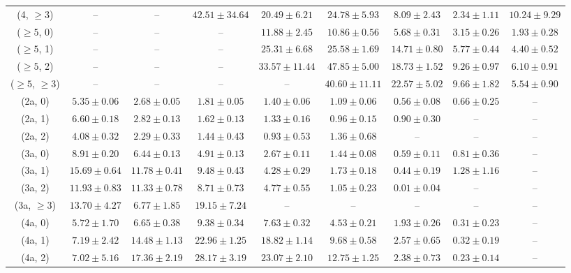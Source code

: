 \begin{table}[h!]
{\begin{tabular}{ccccccccc}
	(4, $\ge3$) & -- & -- & $42.51\pm 34.64$ & $20.49\pm 6.21$ & $24.78\pm 5.93$ & $8.09\pm 2.43$ & $2.34\pm 1.11$ & $10.24\pm 9.29$ \\[0.5ex] 
	($\ge5$, 0) & -- & -- & -- & $11.88\pm 2.45$ & $10.86\pm 0.56$ & $5.68\pm 0.31$ & $3.15\pm 0.26$ & $1.93\pm 0.28$ \\[0.5ex] 
	($\ge5$, 1) & -- & -- & -- & $25.31\pm 6.68$ & $25.58\pm 1.69$ & $14.71\pm 0.80$ & $5.77\pm 0.44$ & $4.40\pm 0.52$ \\[0.5ex] 
	($\ge5$, 2) & -- & -- & -- & $33.57\pm 11.44$ & $47.85\pm 5.00$ & $18.73\pm 1.52$ & $9.26\pm 0.97$ & $6.10\pm 0.91$ \\[0.5ex] 
	($\ge5$, $\ge3$) & -- & -- & -- & -- & $40.60\pm 11.11$ & $22.57\pm 5.02$ & $9.66\pm 1.82$ & $5.54\pm 0.90$ \\[0.5ex] 
	(2a, 0) & $5.35\pm 0.06$ & $2.68\pm 0.05$ & $1.81\pm 0.05$ & $1.40\pm 0.06$ & $1.09\pm 0.06$ & $0.56\pm 0.08$ & $0.66\pm 0.25$ & -- \\[0.5ex] 
	(2a, 1) & $6.60\pm 0.18$ & $2.82\pm 0.13$ & $1.62\pm 0.13$ & $1.33\pm 0.16$ & $0.96\pm 0.15$ & $0.90\pm 0.30$ & -- & -- \\[0.5ex] 
	(2a, 2) & $4.08\pm 0.32$ & $2.29\pm 0.33$ & $1.44\pm 0.43$ & $0.93\pm 0.53$ & $1.36\pm 0.68$ & -- & -- & -- \\[0.5ex] 
	(3a, 0) & $8.91\pm 0.20$ & $6.44\pm 0.13$ & $4.91\pm 0.13$ & $2.67\pm 0.11$ & $1.44\pm 0.08$ & $0.59\pm 0.11$ & $0.81\pm 0.36$ & -- \\[0.5ex] 
	(3a, 1) & $15.69\pm 0.64$ & $11.78\pm 0.41$ & $9.48\pm 0.43$ & $4.28\pm 0.29$ & $1.73\pm 0.18$ & $0.44\pm 0.19$ & $1.28\pm 1.16$ & -- \\[0.5ex] 
	(3a, 2) & $11.93\pm 0.83$ & $11.33\pm 0.78$ & $8.71\pm 0.73$ & $4.77\pm 0.55$ & $1.05\pm 0.23$ & $0.01\pm 0.04$ & -- & -- \\[0.5ex] 
	(3a, $\ge3$) & $13.70\pm 4.27$ & $6.77\pm 1.85$ & $19.15\pm 7.24$ & -- & -- & -- & -- & -- \\[0.5ex] 
	(4a, 0) & $5.72\pm 1.70$ & $6.65\pm 0.38$ & $9.38\pm 0.34$ & $7.63\pm 0.32$ & $4.53\pm 0.21$ & $1.93\pm 0.26$ & $0.31\pm 0.23$ & -- \\[0.5ex] 
	(4a, 1) & $7.19\pm 2.42$ & $14.48\pm 1.13$ & $22.96\pm 1.25$ & $18.82\pm 1.14$ & $9.68\pm 0.58$ & $2.57\pm 0.65$ & $0.32\pm 0.19$ & -- \\[0.5ex] 
	(4a, 2) & $7.02\pm 5.16$ & $17.36\pm 2.19$ & $28.17\pm 3.19$ & $23.07\pm 2.10$ & $12.75\pm 1.25$ & $2.38\pm 0.73$ & $0.23\pm 0.14$ & -- \\[0.5ex] 

\end{tabular}}
\end{table}
